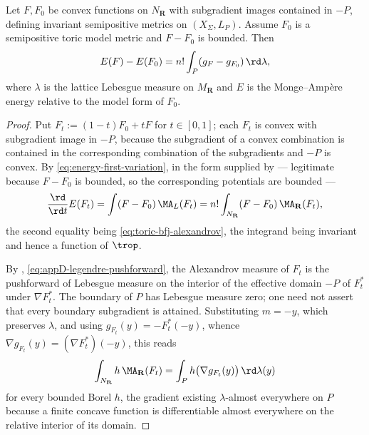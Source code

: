 \begin{theorem}
\label{thm:ch26-toric-energy}
Let $F,F_0$ be convex functions on $N_{\mathbf R}$ with subgradient
images contained in $-P$, defining invariant semipositive metrics on
$(X_\Sigma,L_P)$.  Assume $F_0$ is a semipositive toric model metric and
$F-F_0$ is bounded.  Then
\begin{equation}
\label{eq:ch26-toric-energy}
 E(F)-E(F_0)=n!\int_P(g_F-g_{F_0})\,\rd\lambda,
\end{equation}
where $\lambda$ is the lattice Lebesgue measure on $M_{\mathbf R}$ and
$E$ is the Monge--Amp\`ere energy relative to the model form of $F_0$.
\end{theorem}

\begin{proof}
Put $F_t:=(1-t)F_0+tF$ for $t\in[0,1]$; each $F_t$ is convex with
subgradient image in $-P$, because the subgradient of a convex combination
is contained in the corresponding combination of the subgradients and $-P$
is convex.  By \eqref{eq:energy-first-variation}, in the form supplied by
 --- legitimate because $F-F_0$ is
bounded, so the corresponding potentials are bounded ---
\[
 \frac{\rd}{\rd t}E(F_t)
 =\int(F-F_0)\,\MA_{L}(F_t)
 =n!\int_{N_{\mathbf R}}(F-F_0)\,\MA_{\mathbf R}(F_t),
\]
the second equality being \eqref{eq:toric-bfj-alexandrov}, the integrand
being invariant and hence a function of $\trop$.

By , \eqref{eq:appD-legendre-pushforward},
the Alexandrov measure of $F_t$ is the pushforward of Lebesgue measure on
the interior of the effective domain $-P$ of $F_t^*$ under
$\nabla F_t^*$.  The boundary of $P$ has Lebesgue measure zero; one need
not assert that every boundary subgradient is attained.  Substituting
$m=-y$, which preserves $\lambda$, and using
$g_{F_t}(y)=-F_t^*(-y)$, whence
$\nabla g_{F_t}(y)=(\nabla F_t^*)(-y)$, this reads
\begin{equation}
\label{eq:ch26-toric-pushforward}
 \int_{N_{\mathbf R}}h\,\MA_{\mathbf R}(F_t)
 =\int_{P}h\bigl(\nabla g_{F_t}(y)\bigr)\,\rd\lambda(y)
\end{equation}
for every bounded Borel $h$, the gradient existing $\lambda$-almost
everywhere on $P$ because a finite concave function is differentiable
almost everywhere on the relative interior of its domain.


\end{proof}
